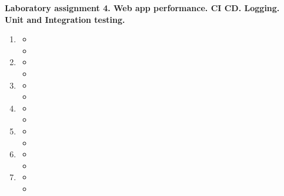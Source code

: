 
\pagebreak
\begin{center}
\textbf{Laboratory assignment 4. Web app performance. CI CD. Logging. Unit and Integration testing.}
\end{center}

\medskip
\begin{enumerate}
\item

\begin{itemize}
\item

\item
\end{itemize}



\item

\begin{itemize}
\item

\item
\end{itemize}




\item

\begin{itemize}
\item

\item
\end{itemize}




\item

\begin{itemize}
\item

\item
\end{itemize}




\item

\begin{itemize}
\item

\item
\end{itemize}



\item

\begin{itemize}
\item

\item
\end{itemize}



\item

\begin{itemize}
\item

\item
\end{itemize}

\end{enumerate}

